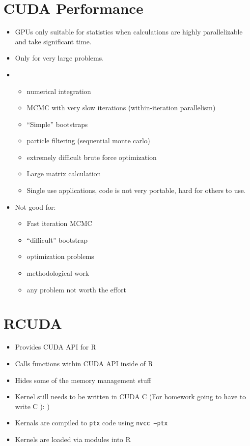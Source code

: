 \documentclass[]{article}
\begin{document}
\section*{CUDA Performance}
\begin{itemize}
\item
GPUs only suitable for statistics when calculations are highly parallelizable and take significant time.
\item
Only for very large problems.  
\item
\begin{itemize}
\item
numerical integration
\item
MCMC with very slow iterations (within-iteration parallelism)
\item
``Simple'' bootstraps
\item
particle filtering (sequential monte carlo)
\item
extremely difficult brute force optimization
\item
Large matrix calculation
\item
Single use applications, code is not very portable, hard for others to use.
\end{itemize}
\item
Not good for:
\begin{itemize}
\item
Fast iteration MCMC
\item
``difficult'' bootstrap
\item optimization problems
\item methodological work
\item any problem not worth the effort
\end{itemize}
\end{itemize}


\section*{RCUDA}
\begin{itemize}
\item
Provides CUDA API for R

\item
Calls functions within CUDA API inside of R

\item
Hides some of the memory management stuff

\item
Kernel still needs to be written in CUDA C (For homework going to have to write C   ):   )

\item
Kernals are compiled to \texttt{ptx} code using \texttt{nvcc --ptx}

\item
Kernels are loaded via modules into R
\end{itemize}
\end{document}
